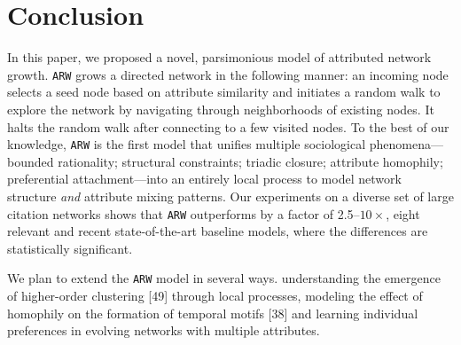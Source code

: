 \section{Conclusion}
\label{sec:Conclusion}

In this paper, we proposed a novel, parsimonious model of attributed network growth. \texttt{ARW} grows a directed network in the following manner: an incoming node selects a seed node based on attribute similarity and initiates a random walk to explore the network by navigating through neighborhoods of existing nodes. It halts the random walk after connecting to a few visited nodes. To the best of our knowledge, \texttt{ARW} is the first model that unifies multiple sociological phenomena---bounded rationality; structural constraints; triadic closure; attribute homophily; preferential attachment---into an entirely local process to model network structure \textit{and} attribute mixing patterns. Our experiments on a diverse set of large citation networks shows that \texttt{ARW} outperforms by a factor of 2.5--$10\times$, eight relevant and recent state-of-the-art baseline models, where the differences are statistically significant.

We plan to extend the \texttt{ARW} model in several ways. understanding the emergence of higher-order clustering [49] through local processes, modeling the effect of homophily on the formation of temporal motifs [38]
and learning individual preferences in evolving networks with multiple attributes.



